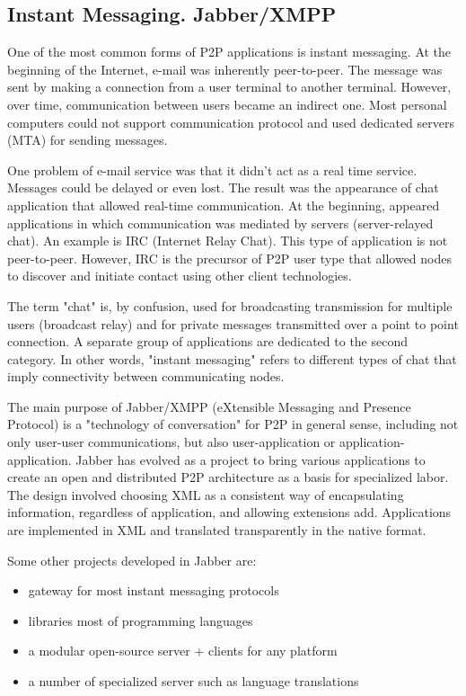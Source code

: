 \subsection{Instant Messaging. Jabber/XMPP}

One of the most common forms of P2P applications is instant messaging. At the
beginning of the Internet, e-mail was inherently peer-to-peer. The message was
sent by making a connection from a user terminal to another terminal. However,
over time, communication between users became an indirect one. Most personal
computers could not support communication protocol and used dedicated servers
(MTA) for sending messages.

One problem of e-mail service was that it didn't act as a real time service.
Messages could be delayed or even lost. The result was the appearance of
chat application that allowed real-time communication. At the beginning,
appeared applications in which communication was mediated by servers
(server-relayed chat). An example is IRC (Internet Relay Chat). This type of
application is not peer-to-peer. However, IRC is the precursor of P2P user type
that allowed nodes to discover and initiate contact using other client
technologies.

The term "chat" is, by confusion, used for broadcasting transmission for
multiple users (broadcast relay) and for private messages transmitted over a
point to point connection. A separate group of applications are dedicated to
the second category. In other words, "instant messaging" refers to different
types of chat that imply connectivity between communicating nodes.

The main purpose of Jabber/XMPP (eXtensible Messaging and Presence Protocol)
is a "technology of conversation" for P2P in general sense, including not only
user-user communications, but also user-application or application-application.
Jabber has evolved as a project to bring various applications to create an open
and distributed P2P architecture as a basis for specialized labor. The design
involved choosing XML as a consistent way of encapsulating information,
regardless of application, and allowing extensions add. Applications are
implemented in XML and translated transparently in the native format.

Some other projects developed in Jabber are:
\begin{itemize}
  \item gateway for most instant messaging protocols
  \item libraries most of programming languages
  \item a modular open-source server + clients for any platform
  \item a number of specialized server such as language translations
\end{itemize}

